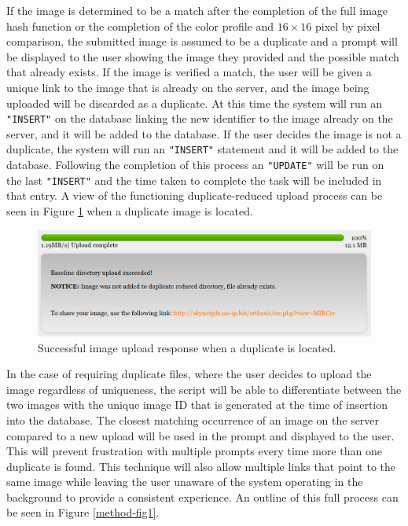 If the image is determined to be a match after the completion of the full image hash function or the completion of the color profile and $16\times16$ pixel by pixel comparison, the submitted image is assumed to be a duplicate and a prompt will be displayed to the user showing the image they provided and the possible match that already exists. If the image is verified a match, the user will be given a unique link to the image that is already on the server, and the image being uploaded will be discarded as a duplicate. At this time the system will run an {\tt "INSERT"} on the database linking the new identifier to the image already on the server, and it will be added to the database. If the user decides the image is not a duplicate, the system will run an {\tt "INSERT"} statement and it will be added to the database. Following the completion of this process an {\tt "UPDATE"} will be run on the last {\tt "INSERT"} and the time taken to complete the task will be included in that entry. A view of the functioning duplicate-reduced upload process can be seen in Figure \ref{success_dupfound} when a duplicate image is located.

\begin{figure}[htbp]
\centering
\includegraphics[width=5.5in]{success_dupfound}
\caption{Successful image upload response when a duplicate is located.}
\label{success_dupfound}
\end{figure}

In the case of requiring duplicate files, where the user decides to upload the image regardless of uniqueness, the script will be able to differentiate between the two images with the unique image ID that is generated at the time of insertion into the database. The closest matching occurrence of an image on the server compared to a new upload will be used in the prompt and displayed to the user. This will prevent frustration with multiple prompts every time more than one duplicate is found. This technique will also allow multiple links that point to the same image while leaving the user unaware of the system operating in the background to provide a consistent experience. An outline of this full process can be seen in Figure \ref{method-fig1}.

